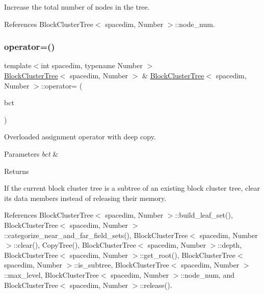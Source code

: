 Increase the total number of nodes in the tree. 

References Block\+Cluster\+Tree$<$ spacedim, Number $>$\+::node\+\_\+num.

\mbox{\label{classBlockClusterTree_a85553cc442e419b8d707720312118328}} 
\subsubsection{\texorpdfstring{operator=()}{operator=()}\hspace{0.1cm}{\footnotesize\ttfamily [1/2]}}
{\footnotesize\ttfamily template$<$int spacedim, typename Number $>$ \\
\hyperlink{classBlockClusterTree}{Block\+Cluster\+Tree}$<$ spacedim, Number $>$ \& \hyperlink{classBlockClusterTree}{Block\+Cluster\+Tree}$<$ spacedim, Number $>$\+::operator= (\begin{DoxyParamCaption}\item[{const \hyperlink{classBlockClusterTree}{Block\+Cluster\+Tree}$<$ spacedim, Number $>$ \&}]{bct }\end{DoxyParamCaption})}

Overloaded assignment operator with deep copy. 
\begin{DoxyParams}{Parameters}
{\em bct} & \\
\hline
\end{DoxyParams}
\begin{DoxyReturn}{Returns}

\end{DoxyReturn}
If the current block cluster tree is a subtree of an existing block cluster tree, clear its data members instead of releasing their memory.

References Block\+Cluster\+Tree$<$ spacedim, Number $>$\+::build\+\_\+leaf\+\_\+set(), Block\+Cluster\+Tree$<$ spacedim, Number $>$\+::categorize\+\_\+near\+\_\+and\+\_\+far\+\_\+field\+\_\+sets(), Block\+Cluster\+Tree$<$ spacedim, Number $>$\+::clear(), Copy\+Tree(), Block\+Cluster\+Tree$<$ spacedim, Number $>$\+::depth, Block\+Cluster\+Tree$<$ spacedim, Number $>$\+::get\+\_\+root(), Block\+Cluster\+Tree$<$ spacedim, Number $>$\+::is\+\_\+subtree, Block\+Cluster\+Tree$<$ spacedim, Number $>$\+::max\+\_\+level, Block\+Cluster\+Tree$<$ spacedim, Number $>$\+::node\+\_\+num, and Block\+Cluster\+Tree$<$ spacedim, Number $>$\+::release().



